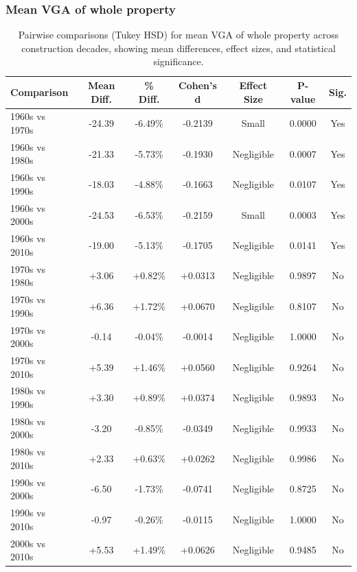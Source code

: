\subsubsection{Mean VGA of whole property}
\begin{table}[htbp]
    \centering
    \begin{tabular}{l|c|c|c|c|c|c}
    \hline
    \textbf{Comparison} & \textbf{Mean Diff.} & \textbf{\% Diff.} & \textbf{Cohen's d} & \textbf{Effect Size} & \textbf{P-value} & \textbf{Sig.} \\
    \hline
    1960s vs 1970s & -24.39 & -6.49\% & -0.2139 & Small & 0.0000 & Yes \\
    1960s vs 1980s & -21.33 & -5.73\% & -0.1930 & Negligible & 0.0007 & Yes \\
    1960s vs 1990s & -18.03 & -4.88\% & -0.1663 & Negligible & 0.0107 & Yes \\
    1960s vs 2000s & -24.53 & -6.53\% & -0.2159 & Small & 0.0003 & Yes \\
    1960s vs 2010s & -19.00 & -5.13\% & -0.1705 & Negligible & 0.0141 & Yes \\
    1970s vs 1980s & +3.06 & +0.82\% & +0.0313 & Negligible & 0.9897 & No \\
    1970s vs 1990s & +6.36 & +1.72\% & +0.0670 & Negligible & 0.8107 & No \\
    1970s vs 2000s & -0.14 & -0.04\% & -0.0014 & Negligible & 1.0000 & No \\
    1970s vs 2010s & +5.39 & +1.46\% & +0.0560 & Negligible & 0.9264 & No \\
    1980s vs 1990s & +3.30 & +0.89\% & +0.0374 & Negligible & 0.9893 & No \\
    1980s vs 2000s & -3.20 & -0.85\% & -0.0349 & Negligible & 0.9933 & No \\
    1980s vs 2010s & +2.33 & +0.63\% & +0.0262 & Negligible & 0.9986 & No \\
    1990s vs 2000s & -6.50 & -1.73\% & -0.0741 & Negligible & 0.8725 & No \\
    1990s vs 2010s & -0.97 & -0.26\% & -0.0115 & Negligible & 1.0000 & No \\
    2000s vs 2010s & +5.53 & +1.49\% & +0.0626 & Negligible & 0.9485 & No \\
    \hline
    \end{tabular}
    \caption{Pairwise comparisons (Tukey HSD) for mean VGA of whole property across construction decades, showing mean differences, effect sizes, and statistical significance.}
    \label{tab:mean_vga_tukey_hsd}
\end{table}

